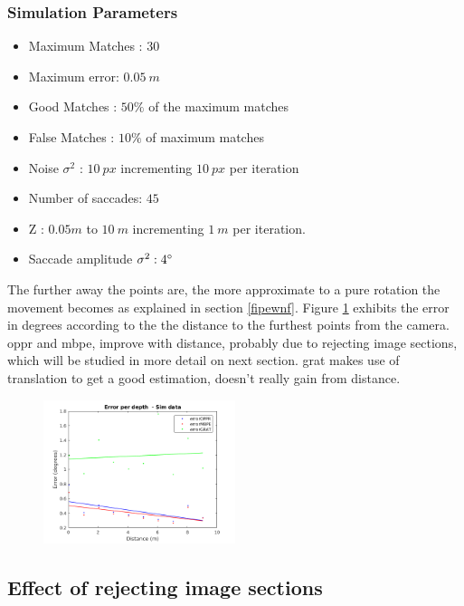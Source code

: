 \subsubsection{Simulation Parameters}
\begin{itemize}
	\item Maximum Matches : $30$
	\item Maximum error: $0.05 \ m$
	\item Good Matches : $50 \%$ of the maximum matches
	\item False Matches : $10 \%$ of maximum matches
	\item Noise $\sigma^2$ : $10 \ px$ incrementing $10 \ px$ per iteration
	\item Number of saccades: $45$
	\item Z : $0.05 m$ to $10 \ m$ incrementing $1 \ m$ per iteration.
	\item Saccade amplitude $\sigma^2 : 4 \degree $
\end{itemize}
The further away the points are, the more approximate to a pure rotation the movement becomes as explained in section \ref{fipewnf}.
Figure \ref{cha5:sec1:depthh} exhibits the error in degrees according to the the distance to the furthest points from the camera. \acrshort{oppr} and \acrshort{mbpe}, improve with distance, probably due to rejecting image sections, which will be studied in more detail on next section. \acrshort{grat} makes use of translation to get a good estimation, doesn't really gain from distance.
\begin{figure}[ht]
	\centering
	\includegraphics[width=0.5\textwidth]{images/sim/depthh.png}
	\label{cha5:sec1:depthh}
\end{figure}	

\subsection{Effect of rejecting image sections}

